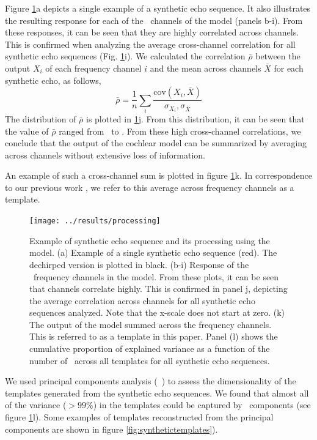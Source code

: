 \documentclass[preprint,5p]{elsarticle}
\begin{document}
Figure \ref{fig:processing}a depicts a single example of a synthetic echo sequence. It also illustrates the resulting response for each of the \nfilters\ channels of the \citet{Wiegrebe2008} model (panels b-i). From these responses, it can be seen that they are highly correlated across channels. This is confirmed when analyzing the average cross-channel correlation for all synthetic echo sequences (Fig. \ref{fig:processing}i). We calculated the correlation $\bar{\rho}$ between the output $X_i$ of each frequency channel $i$ and the mean across channels $\bar{X}$ for each synthetic echo, as follows,
%
\begin{equation}
\bar{\rho} = \frac{1}{n} \sum_i \frac{\mbox{cov}(X_i,\bar{X})}{\sigma_{X_i}, \sigma_{\bar{X}}} 
\end{equation}
%
The distribution of $\bar{\rho}$ is plotted in \ref{fig:processing}j. From this distribution, it can be seen that the value of $\bar{\rho}$ ranged from \CorrelationLow\ to \CorrelationHigh. From these high cross-channel correlations, we conclude that the output of the cochlear model can be summarized by averaging across channels without extensive loss of information. 

An example of such a cross-channel sum is plotted in figure \ref{fig:processing}k. In correspondence to our previous work \citep{Vanderelst2016}, we refer to this average across frequency channels as a template.

\begin{figure}[tb]
	\centering
	\texttt{[image: ../results/processing]}
	\caption{Example of synthetic echo sequence and its processing using the \citet{Wiegrebe2008} model. (a) Example of a single synthetic echo sequence (red). The dechirped version is plotted in black. (b-i) Response of the \nfilters\ frequency channels in the \citet{Wiegrebe2008} model. From these plots, it can be seen that channels correlate highly. This is confirmed in panel j, depicting the average correlation across channels for all synthetic echo sequences analyzed. Note that the x-scale does not start at zero. (k) The output of the \citet{Wiegrebe2008} model summed across the frequency channels. This is referred to as a template in this paper. Panel (l) shows the cumulative proportion of explained variance as a function of the number of \pc\ across all templates for all synthetic echo sequences.}
	\label{fig:processing}
\end{figure}

We used principal components analysis (\PCA\ ) to assess the dimensionality of the templates generated from the synthetic echo sequences. We found that almost all of the variance ($> 99\%$) in the templates could be captured by \pca\ components (see figure \ref{fig:processing}l). Some examples of templates reconstructed from the principal components are shown in figure \ref{fig:synthetictemplates}).
\end{document}
